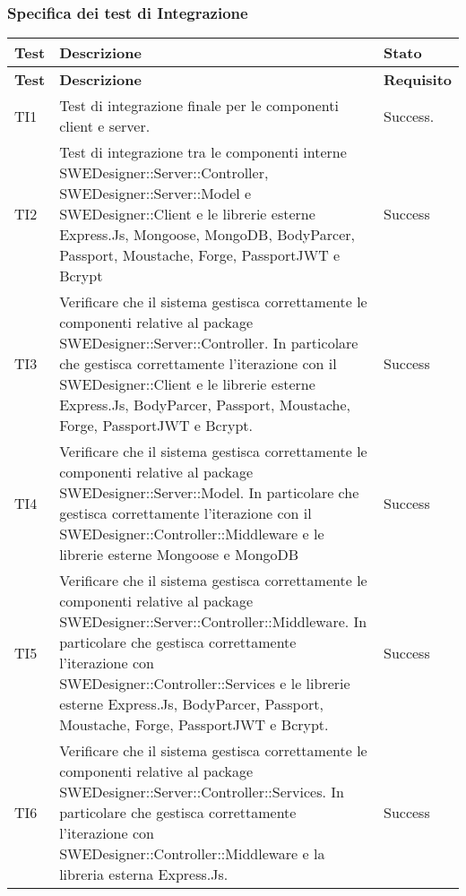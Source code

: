 \subsubsection{Specifica dei test di Integrazione}
\begin{longtable}{p{2cm}!{\VRule[1pt]}p{9.5cm}!{\VRule[1pt]}p{1.5cm}}
\color{white} \textbf{Test} & \color{white} \textbf{Descrizione}  & \color{white} \textbf{Stato}\\ 
\endfirsthead 
{} 
\color{white} \textbf{Test} & \color{white} \textbf{Descrizione}  & \color{white} \textbf{Requisito}\\  
\endhead 
TI1 & Test di integrazione finale per le componenti client e server. & Success.\\

TI2 & Test di integrazione tra le componenti interne SWEDesigner::Server::Controller, SWEDesigner::Server::Model e SWEDesigner::Client e le librerie esterne Express.Js, Mongoose, MongoDB, BodyParcer, Passport, Moustache, Forge, PassportJWT e Bcrypt & Success\\

TI3 & Verificare che il sistema gestisca correttamente le componenti relative al package SWEDesigner::Server::Controller. In particolare che gestisca correttamente l'iterazione con il SWEDesigner::Client e le librerie esterne Express.Js, BodyParcer, Passport, Moustache, Forge, PassportJWT e Bcrypt. & Success\\

TI4 & Verificare che il sistema gestisca correttamente le componenti relative al package SWEDesigner::Server::Model. In particolare che gestisca correttamente l'iterazione con il SWEDesigner::Controller::Middleware e le librerie esterne Mongoose e MongoDB  & Success\\

TI5 & Verificare che il sistema gestisca correttamente le componenti relative al package SWEDesigner::Server::Controller::Middleware. In particolare che gestisca correttamente l'iterazione con SWEDesigner::Controller::Services e le librerie esterne Express.Js, BodyParcer, Passport, Moustache, Forge, PassportJWT e Bcrypt. & Success\\

TI6 & Verificare che il sistema gestisca correttamente le componenti relative al package SWEDesigner::Server::Controller::Services. In particolare che gestisca correttamente l'iterazione con SWEDesigner::Controller::Middleware e la libreria esterna Express.Js. & Success\\


\end{longtable}
